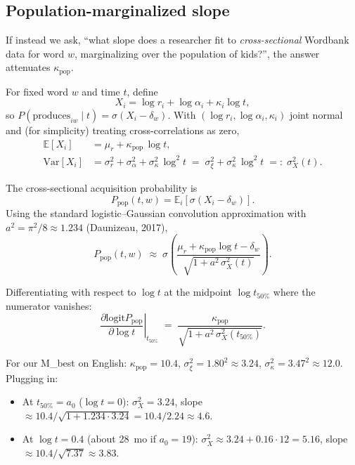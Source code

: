\documentclass[11pt]{article}
\newcommand{\E}{\mathbb{E}}
\newcommand{\Var}{\mathrm{Var}}
\newcommand{\logit}{\mathrm{logit}}
\begin{document}
\subsection{Population-marginalized slope}

If instead we ask, ``what slope does a researcher fit to
\emph{cross-sectional} Wordbank data for word $w$, marginalizing
over the population of kids?'', the answer attenuates $\kappa_{\text{pop}}$.

For fixed word $w$ and time $t$, define
\begin{equation*}
X_i = \log r_i + \log\alpha_i + \kappa_i \log t,
\end{equation*}
so $P(\text{produces}_{iw}\mid t) = \sigma(X_i - \delta_w)$.
With $(\log r_i, \log\alpha_i, \kappa_i)$ joint normal and (for
simplicity) treating cross-correlations as zero,
\begin{align}
\E[X_i] &= \mu_r + \kappa_{\text{pop}}\,\log t, \\
\Var[X_i] &= \sigma_r^2 + \sigma_\alpha^2 + \sigma_\kappa^2\,\log^2 t
        \;=\; \sigma_\xi^2 + \sigma_\kappa^2\,\log^2 t \;=:\; \sigma_X^2(t).
\end{align}

The cross-sectional acquisition probability is
\begin{equation*}
P_{\text{pop}}(t, w) = \E_i\!\left[\sigma(X_i - \delta_w)\right].
\end{equation*}
Using the standard logistic--Gaussian convolution approximation with
$a^2 = \pi^2/8 \approx 1.234$ (Daunizeau, 2017),
\begin{equation}
P_{\text{pop}}(t, w) \;\approx\;
\sigma\!\left(
  \frac{\mu_r + \kappa_{\text{pop}} \log t - \delta_w}
       {\sqrt{1 + a^2\,\sigma_X^2(t)}}
\right).
\label{eq:pop-marginal}
\end{equation}

Differentiating with respect to $\log t$ at the midpoint
$\log t_{50\%}$ where the numerator vanishes:
\begin{equation}
\boxed{
\left.\frac{\partial \logit P_{\text{pop}}}{\partial \log t}\right|_{t_{50\%}}
\;=\;
\frac{\kappa_{\text{pop}}}{\sqrt{1 + a^2\,\sigma_X^2(t_{50\%})}}.
}
\label{eq:pop-slope}
\end{equation}

For our M\_best on English: $\kappa_{\text{pop}} = 10.4$, $\sigma_\xi^2 = 1.80^2 \approx 3.24$, $\sigma_\kappa^2 = 3.47^2 \approx 12.0$. Plugging in:
\begin{itemize}\setlength\itemsep{0.2em}
\item At $t_{50\%}=a_0$ ($\log t = 0$): $\sigma_X^2 = 3.24$, slope $\approx 10.4/\sqrt{1+1.234\cdot 3.24} = 10.4/2.24 \approx 4.6$.
\item At $\log t = 0.4$ (about 28~mo if $a_0=19$): $\sigma_X^2 \approx 3.24 + 0.16\cdot 12 = 5.16$, slope $\approx 10.4/\sqrt{7.37} \approx 3.83$.
\end{itemize}
\end{document}
